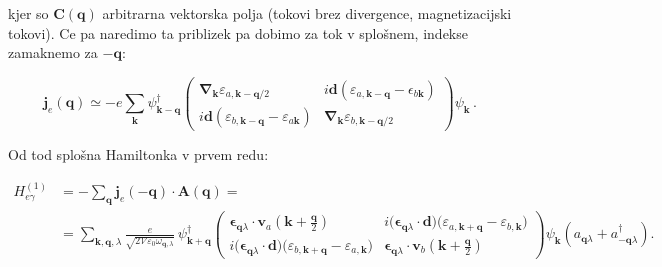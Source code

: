 \documentclass[a4paper,10pt]{article}
\renewcommand{\vec}[1]{\mathbf{#1}}
\begin{document}
kjer so $\mathbf{C}(\mathbf{q})$ arbitrarna vektorska polja (tokovi brez divergence, magnetizacijski tokovi). Ce pa naredimo ta priblizek pa dobimo za tok v splošnem, indekse zamaknemo za $-\vec{q}$: 
\begin{tcolorbox}
\begin{equation}
\vec{j}_e(\vec{q}) \simeq -e \sum_{\vec{k}} \psi_{\vec{k}-\vec{q}}^\dagger \begin{pmatrix} \vec{\nabla}_{\vec{k}} \varepsilon_{a,\vec{k}-\vec{q}/2} & i\vec{d}(\varepsilon_{a, \vec{k}-\vec{q}} - \epsilon_{b\vec{k}}) \\ i\vec{d}(\varepsilon_{b, \vec{k}-\vec{q}} - \varepsilon_{a\vec{k}}) & \vec{\nabla}_{\vec{k}} \varepsilon_{b,\vec{k}-\vec{q}/2} \end{pmatrix} \psi_{\vec{k}}\,.
\end{equation}
\end{tcolorbox}
Od tod splošna Hamiltonka v prvem redu:
\begin{tcolorbox}
\begin{align}
H_{e\gamma}^{(1)}
&= -\sum_{\vec{q}} \vec{j}_e(\vec{-q}) \cdot \vec{A}(\vec{q}) = \\
&= \sum_{\vec{k},\vec{q},\lambda} \frac{e}{\sqrt{2\mathcal{V}\varepsilon_0\omega_{\vec{q}, \lambda}}}\, \psi_{\vec{k}+\vec{q}}^\dagger \begin{pmatrix} \bm{\epsilon}_{\vec{q}\lambda}\cdot \vec{v}_a\!\left(\vec{k}+\frac{\vec{q}}{2}\right) & i\bigl(\bm{\epsilon}_{\vec{q}\lambda}\cdot\vec{d}\bigr) \bigl(\varepsilon_{a,\vec{k}+\vec{q}}-\varepsilon_{b,\vec{k}}\bigr) \\ i\bigl(\bm{\epsilon}_{\vec{q}\lambda}\cdot\vec{d}\bigr) \bigl(\varepsilon_{b,\vec{k}+\vec{q}}-\varepsilon_{a,\vec{k}}\bigr) & \bm{\epsilon}_{\vec{q}\lambda}\cdot \vec{v}_b\!\left(\vec{k}+\frac{\vec{q}}{2}\right) \end{pmatrix} \psi_{\vec{k}} \left(a_{\vec{q}\lambda}+a_{-\vec{q}\lambda}^\dagger\right).
\end{align}
\end{tcolorbox}
\end{document}
